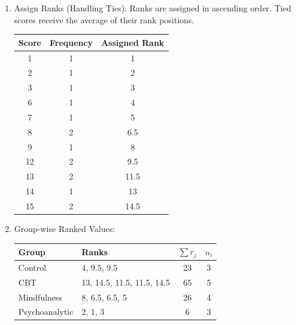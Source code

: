 \documentclass[a4paper,fleqn,review]{cas-sc}
\begin{document}
\begin{enumerate}[Step 1.]
	\item Assign Ranks (Handling Ties): Ranks are assigned in ascending order. Tied scores receive the average of their rank positions.
	\begin{center}
		\renewcommand{\arraystretch}{1.3}
		\begin{tabular}{|c|c|c|}
			\hline
			\textbf{Score} & \textbf{Frequency} & \textbf{Assigned Rank} \\
			\hline
			1 & 1 & 1 \\
			2 & 1 & 2 \\
			3 & 1 & 3 \\
			6 & 1 & 4 \\
			7 & 1 & 5 \\
			8 & 2 & 6.5 \\
			9 & 1 & 8 \\
			12 & 2 & 9.5 \\
			13 & 2 & 11.5 \\
			14 & 1 & 13 \\
			15 & 2 & 14.5 \\
			\hline
		\end{tabular}
	\end{center}
	\pagebreak
	\item Group-wise Ranked Values:
	\begin{center}
		\renewcommand{\arraystretch}{1.3}
		\begin{tabular}{|l|l|c|c|}
			\hline
			\textbf{Group} & \textbf{Ranks} & $\sum r_j$ & $n_i$ \\
			\hline
			Control & 4, 9.5, 9.5 & 23 & 3 \\
			CBT & 13, 14.5, 11.5, 11.5, 14.5 & 65 & 5 \\
			Mindfulness & 8, 6.5, 6.5, 5 & 26 & 4 \\
			Psychoanalytic & 2, 1, 3 & 6 & 3 \\
			\hline
		\end{tabular}
	\end{center}
	

\end{enumerate}
\end{document}

